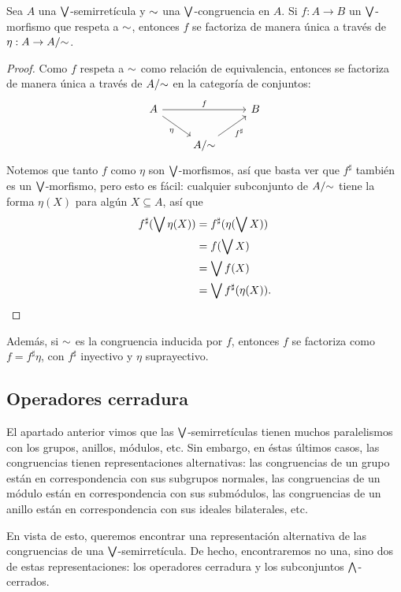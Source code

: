 \begin{prop}
  Sea $A$ una $\bigvee$-semirretícula y ${\sim}$ una
  $\bigvee$-congruencia en $A$.
  Si $f:A\to B$ un $\bigvee$-morfismo que respeta a ${\sim}$,
  entonces $f$ se factoriza de manera única
  a través de $\eta:A\to A/{\sim}$.
\end{prop}
\begin{proof}
  Como $f$ respeta a ${\sim}$ como relación de equivalencia,
  entonces se factoriza de manera única a través de $A/{\sim}$ en
  la categoría de conjuntos:
  \[
    \begin{tikzcd}
      A \ar[rr,"f"] \ar[dr,"\eta"'] & & B \\
      & A/\simr \ar[ur,"f^\sharp"']
    \end{tikzcd}
  \]
  Notemos que tanto $f$ como $\eta$ son $\bigvee$-morfismos, así
  que basta ver que $f^\sharp$ también es un $\bigvee$-morfismo,
  pero esto es fácil: cualquier subconjunto de $A/{\sim}$ tiene la
  forma $\eta(X)$ para algún $X\subseteq A$, así que
  \begin{align*}
    f^\sharp(\bigvee \eta(X))
    &= f^\sharp(\eta(\bigvee X)) \\
    &= f(\bigvee X) \\
    &= \bigvee f(X) \\
    &= \bigvee f^\sharp(\eta(X)).
  \end{align*}
\end{proof}
Además, si ${\sim}$ es la congruencia inducida por $f$,
entonces $f$ se factoriza como $f=f^\sharp\eta$, con $f^\sharp$
inyectivo y $\eta$ suprayectivo.

\subsection{Operadores cerradura}

El apartado anterior vimos que las $\bigvee$-semirretículas tienen
muchos paralelismos con los grupos, anillos, módulos, etc.
Sin embargo, en éstas últimos casos, las congruencias tienen
representaciones alternativas: las congruencias de un grupo están
en correspondencia con sus subgrupos normales,
las congruencias de un módulo están en correspondencia con sus
submódulos, las congruencias de un anillo están en
correspondencia con sus ideales bilaterales, etc.

En vista de esto, queremos encontrar una representación
alternativa de las congruencias de una $\bigvee$-semirretícula.
De hecho, encontraremos no una, sino dos de estas
representaciones: los operadores cerradura y los
subconjuntos $\bigwedge$-cerrados.

